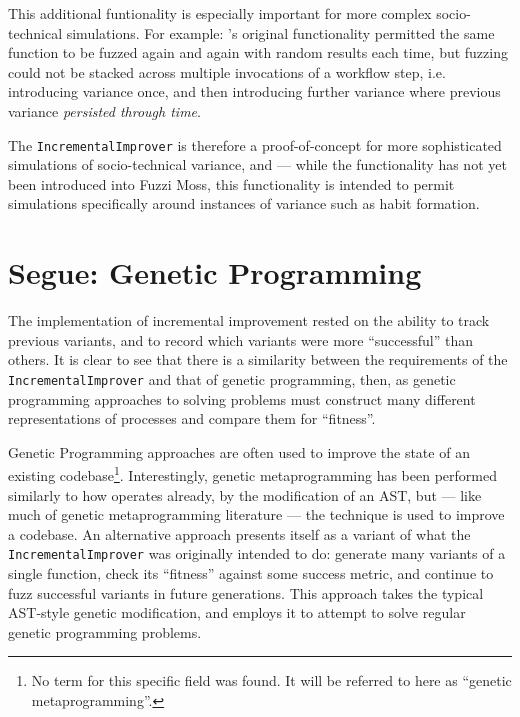 \documentclass[draft]{article}
\begin{document}
This additional funtionality is especially important for more complex
socio-technical simulations. For example: \pdsf{}'s original functionality
permitted the same function to be fuzzed again and again with random results
each time, but fuzzing could not be stacked across multiple invocations of a
workflow step, i.e. introducing variance once, and then introducing
further variance where previous variance \emph{persisted through time}.\par

The \texttt{IncrementalImprover} is therefore a proof-of-concept for more
sophisticated simulations of socio-technical variance, and --- while the
functionality has not yet been introduced into Fuzzi Moss, this functionality is
intended to permit simulations specifically around instances of variance such as
habit formation.\par


\section{Segue: Genetic Programming}
The implementation of incremental improvement rested on the ability to track
previous variants, and to record which variants were more ``successful'' than
others. It is clear to see that there is a similarity between the requirements
of the \texttt{IncrementalImprover} and that of genetic programming, then, as
genetic programming approaches to solving problems must construct many different
representations of processes and compare them for ``fitness''.\par

Genetic Programming approaches are often used to improve the state of an
existing codebase\cite{locoGP}\footnote{No term for this
  specific field was found. It will be referred to here as ``genetic
  metaprogramming''.}. Interestingly, genetic metaprogramming has been performed
similarly to how \pdsf{} operates already, by the modification of an
AST\cite{locoGP}, but --- like much of genetic metaprogramming literature ---
the technique is used to improve a codebase. An alternative approach presents
itself as a variant of what the \texttt{IncrementalImprover} was originally
intended to do: generate many variants of a single function, check its
``fitness'' against some success metric, and continue to fuzz successful
variants in future generations. This approach takes the typical AST-style
genetic modification, and employs it to attempt to solve regular genetic
programming problems.\par
\end{document}
